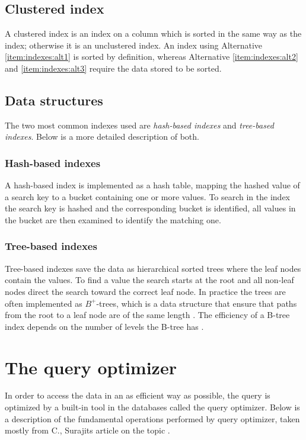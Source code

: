 \subsection{Clustered index}
A clustered index is an index on a column which is sorted in the same way as the index; otherwise it is an unclustered index. An index using Alternative \ref{item:indexes:alt1} is sorted by definition, whereas Alternative \ref{item:indexes:alt2} and \ref{item:indexes:alt3} require the data stored to be sorted.

\subsection{Data structures}
The two most common indexes used are \textit{hash-based indexes} and \textit{tree-based indexes}. Below is a more detailed description of both.

\subsubsection{Hash-based indexes}
A hash-based index is implemented as a hash table, mapping the hashed value of a search key to a bucket containing one or more values. To search in the index the search key is hashed and the corresponding bucket is identified, all values in the bucket are then examined to identify the matching one.

\subsubsection{Tree-based indexes}
Tree-based indexes save the data as hierarchical sorted trees where the leaf nodes contain the values. To find a value the search starts at the root and all non-leaf nodes direct the search toward the correct leaf node. In practice the trees are often implemented as $B^{+}$-trees, which is a data structure that ensure that paths from the root to a leaf node are of the same length \cite{comer_1979_ubiquitous_ub}. The efficiency of a B-tree index depends on the number of levels the B-tree has \cite[p. 645]{garcia-molina_2002_database_dstcb}.

\section{The query optimizer} \label{sec:queryopt}
In order to access the data in an as efficient way as possible, the query is optimized by a built-in tool in the databases called the query optimizer. Below is a description of the fundamental operations performed by query optimizer, taken mostly from C., Surajits article on the topic \cite{chaudhuri_1998_overview_aooqoirs}.

